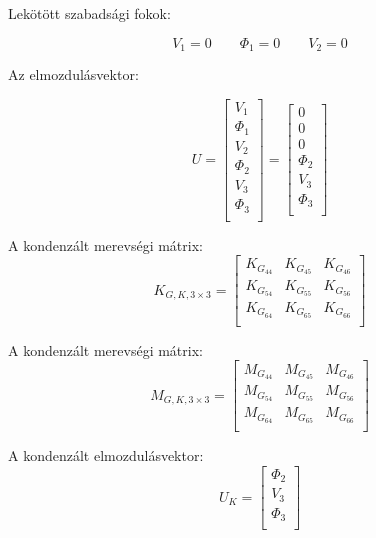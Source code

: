 \documentclass{article}
\begin{document}
			Lekötött szabadsági fokok:
			
			\[V_{1}=0 \qquad \Phi_{1}=0 \qquad V_{2}=0\]	
			
			Az elmozdulásvektor:
			
			\begin{equation}
				U=
				\begin{bmatrix}
				V_{1}    \\
				\Phi_{1} \\
				V_{2}    \\
				\Phi_{2} \\
				V_{3}    \\
				\Phi_{3} \\
				\end{bmatrix}
				=
				\begin{bmatrix}
				0  \\
				0 \\
				0    \\
				\Phi_{2} \\
				V_{3}    \\
				\Phi_{3} \\
				\end{bmatrix}
			\end{equation}
			
			A kondenzált merevségi mátrix: 
			\begin{equation}
				K_{G,K,3\times3}=
				\begin{bmatrix}
				K_{G_{44}}	 & K_{G_{45}}	 & K_{G_{46}}   \\
				K_{G_{54}}	 & K_{G_{55}}	 & K_{G_{56}}   \\
				K_{G_{64}}	 & K_{G_{65}}	 & K_{G_{66}}   \\
				\end{bmatrix}
			\end{equation}
			
			A kondenzált merevségi mátrix: 
			\begin{equation}
				M_{G,K,3\times3}=
				\begin{bmatrix}
				M_{G_{44}}	 & M_{G_{45}}	 & M_{G_{46}}   \\
				M_{G_{54}}	 & M_{G_{55}}	 & M_{G_{56}}   \\
				M_{G_{64}}	 & M_{G_{65}}	 & M_{G_{66}}   \\
				\end{bmatrix}
			\end{equation}
			
			A kondenzált elmozdulásvektor:
			\begin{equation}
				U_K=
				\begin{bmatrix}
				\Phi_{2} \\
				V_{3}    \\
				\Phi_{3} \\
				\end{bmatrix}
			\end{equation} 
	
\end{document}
